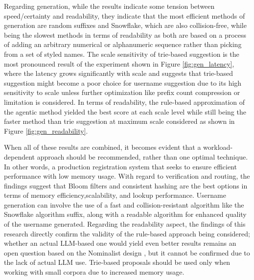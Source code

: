 \documentclass[conference]{IEEEtran}
\begin{document}
Regarding generation, while the results indicate some tension
between speed/certainty and readability, they indicate that the most
efficient methods of generation are random suffixes and Snowflake,
which are also collision-free, while being the slowest methods in terms
of readability as both are based on a process of adding an
arbitrary numerical or alphanumeric sequence rather than picking from a
set of styled names. The scale sensitivity of trie-based suggestion is
the most pronounced result of the experiment shown in Figure
\ref{fig:gen_latency}, where the latency grows significantly with
scale and suggests that trie-based suggestion might become a
poor choice for username suggestion due to its high sensitivity to scale
unless further optimization like prefix count compression or limitation
is considered. In terms of readability, the rule-based approximation of
the agentic method yielded the best score at each scale level while still being the faster method than trie suggestion at maximum scale considered as shown in Figure \ref{fig:gen_readability}.

When all of these results are combined, it becomes evident that a workload-dependent approach should be recommended, rather than one optimal technique. In other words, a production registration system that seeks to ensure efficient performance with low memory usage. With regard to verification and routing, the findings suggest that Bloom filters and consistent hashing are the best options in terms of memory efficiency,scalability, and lookup performance. Username generation can involve the use of a fast and collision-resistant algorithm like the Snowflake algorithm suffix, along with a readable algorithm for enhanced quality of the username generated. Regarding the readability aspect, the findings of this research
directly confirm the validity of the rule-based approach being considered;
whether an actual LLM-based one would yield even better results
remains an open question based on the Nominalist design \cite{b6},
but it cannot be confirmed due to the lack of actual LLM use. Trie-based proposals should be used only when working with small corpora due to increased memory usage.
\end{document}
